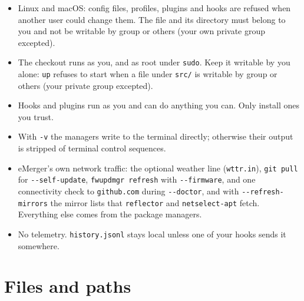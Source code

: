 \documentclass[11pt,a4paper]{article}
\begin{document}
\begin{itemize}
        Files, or a \texttt{ProgramData\textbackslash chocolatey} that
        standard users can write, is refused.
        \texttt{choco upgrade all -y} accepts package licences and runs only
        with \texttt{-{}-accept-licenses}; without it \texttt{choco outdated}
        lists the upgrades. Every child PowerShell (elevated child, step
        runner, scheduled task) starts with \texttt{-ExecutionPolicy Bypass},
        so the \texttt{RemoteSigned} policy does not apply to \texttt{up}'s
        own scripts.
  \item Linux and macOS: config files, profiles, plugins and hooks are
        refused when another user could change them. The file and its
        directory must belong to you and not be writable by group or
        others (your own private group excepted).
  \item The checkout runs as you, and as root under \texttt{sudo}. Keep it
        writable by you alone: \texttt{up} refuses to start when a file
        under \verb|src/| is writable by group or others (your private
        group excepted).
  \item Hooks and plugins run as you and can do anything you can. Only
        install ones you trust.
  \item With \texttt{-v} the managers write to the terminal directly;
        otherwise their output is stripped of terminal control sequences.
  \item eMerger's own network traffic: the optional weather line
        (\texttt{wttr.in}), \texttt{git pull} for \texttt{-{}-self-update},
        \texttt{fwupdmgr refresh} with \texttt{-{}-firmware}, and one
        connectivity check to \texttt{github.com} during
        \texttt{-{}-doctor}, and with \texttt{-{}-refresh-mirrors} the mirror
        lists that \texttt{reflector} and \texttt{netselect-apt} fetch.
        Everything else comes from the package managers.
  \item No telemetry. \texttt{history.jsonl} stays local
        unless one of your hooks sends it somewhere.
\end{itemize}

\section{Files and paths}\label{sec:files}
\end{document}
